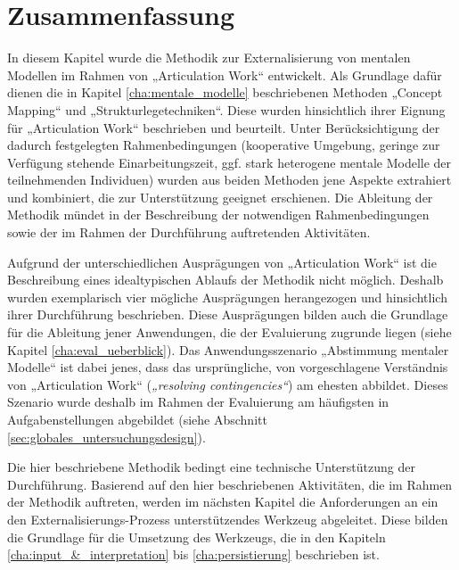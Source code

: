 
\section{Zusammenfassung} %
\label{sec:methodik_zusammenfassung}

In diesem Kapitel wurde die Methodik zur Externalisierung von mentalen Modellen im Rahmen von „Articulation Work“ entwickelt. Als Grundlage dafür dienen die in Kapitel \ref{cha:mentale_modelle} beschriebenen Methoden „Concept Mapping“ und „Strukturlegetechniken“. Diese wurden hinsichtlich ihrer Eignung für „Articulation Work“ beschrieben und beurteilt. Unter Berücksichtigung der dadurch festgelegten Rahmenbedingungen (kooperative Umgebung, geringe zur Verfügung stehende Einarbeitungszeit, ggf. stark heterogene mentale Modelle der teilnehmenden Individuen) wurden aus beiden Methoden jene Aspekte extrahiert und kombiniert, die zur Unterstützung geeignet erschienen. Die Ableitung der Methodik mündet in der Beschreibung der notwendigen Rahmenbedingungen sowie der im Rahmen der Durchführung auftretenden Aktivitäten. 

Aufgrund der unterschiedlichen Ausprägungen von „Articulation Work“ ist die Beschreibung eines idealtypischen Ablaufs der Methodik nicht möglich. Deshalb wurden exemplarisch vier mögliche Ausprägungen herangezogen und hinsichtlich ihrer Durchführung beschrieben. Diese Ausprägungen bilden auch die Grundlage für die Ableitung jener Anwendungen, die der Evaluierung zugrunde liegen (siehe Kapitel \ref{cha:eval_ueberblick}). Das Anwendungsszenario „Abstimmung mentaler Modelle“ ist dabei jenes, dass das ursprüngliche, von \citep{Strauss85} vorgeschlagene Verständnis von „Articulation Work“ (\emph{„resolving contingencies“}) am ehesten abbildet. Dieses Szenario wurde deshalb im Rahmen der Evaluierung am häufigsten in Aufgabenstellungen abgebildet (siehe Abschnitt \ref{sec:globales_untersuchungsdesign}).

Die hier beschriebene Methodik bedingt eine technische Unterstützung der Durchführung. Basierend auf den hier beschriebenen Aktivitäten, die im Rahmen der Methodik auftreten, werden im nächsten Kapitel die Anforderungen an ein den Externalisierungs-Prozess unterstützendes Werkzeug abgeleitet. Diese bilden die Grundlage für die Umsetzung des Werkzeugs, die in den Kapiteln \ref{cha:input_&_interpretation} bis \ref{cha:persistierung} beschrieben ist. 

